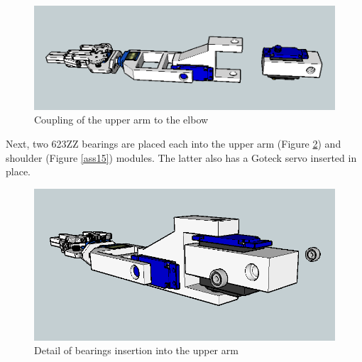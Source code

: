 	\begin{figure}[H]
			\centering
			\includegraphics[scale=0.5]{images/Assembly/11.png}
			\caption{Coupling of the upper arm to the elbow }
			\label{ass11}
	\end{figure}
	\bigskip






Next, two 623ZZ bearings are placed each into the upper arm (Figure \ref{ass13}) and shoulder (Figure \ref{ass15}) modules. The latter also has a Goteck
servo inserted in place.\\

	\begin{figure}[H]
			\centering
			\includegraphics[scale=0.5]{images/Assembly/13.png}
			\caption{Detail of bearings insertion into the upper arm }
			\label{ass13}
	\end{figure}
	\bigskip





